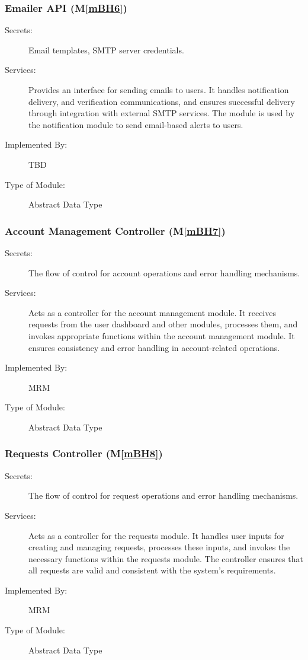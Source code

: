 \documentclass[12pt, titlepage]{article}
\newcommand{\mref}[1]{M\ref{#1}}
\begin{document}
\subsubsection{Emailer API (\mref{mBH6})}

\begin{description}
\item[Secrets:] Email templates, SMTP server credentials.
\item[Services:] Provides an interface for sending emails to users. It handles notification delivery, and verification communications, and ensures successful delivery through integration with external SMTP services. The module is used by the notification module to send email-based alerts to users.
\item[Implemented By:] TBD
\item[Type of Module:] Abstract Data Type
\end{description}

\subsubsection{Account Management Controller (\mref{mBH7})}

\begin{description}
\item[Secrets:] The flow of control for account operations and error handling mechanisms.
\item[Services:] Acts as a controller for the account management module. It receives requests from the user dashboard and other modules, processes them, and invokes appropriate functions within the account management module. It ensures consistency and error handling in account-related operations.
\item[Implemented By:] MRM
\item[Type of Module:] Abstract Data Type
\end{description}

\subsubsection{Requests Controller (\mref{mBH8})}

\begin{description}
\item[Secrets:] The flow of control for request operations and error handling mechanisms.
\item[Services:] Acts as a controller for the requests module. It handles user inputs for creating and managing requests, processes these inputs, and invokes the necessary functions within the requests module. The controller ensures that all requests are valid and consistent with the system’s requirements.
\item[Implemented By:] MRM
\item[Type of Module:] Abstract Data Type
\end{description}
\end{document}
